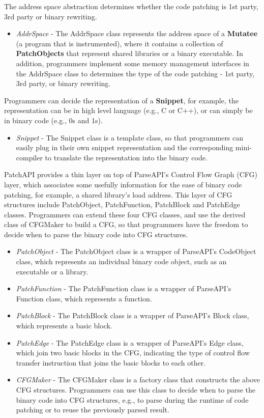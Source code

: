 The address space abstraction determines whether the code patching is 1st party,
3rd party or binary rewriting.
\begin{itemize}
\item \emph{AddrSpace} - The AddrSpace class represents the address space of a
  \textbf{Mutatee} (a program that is instrumented), where it contains a
  collection of \textbf{PatchObjects} that represent shared libraries or a
  binary executable. In addition, programmers implement some memory management
  interfaces in the AddrSpace class to determines the type of the code patching
  - 1st party, 3rd party, or binary rewriting.
\end{itemize}
Programmers can decide the representation of a \textbf{Snippet}, for example, the
representation can be in high level language (e.g., C or C++), or can simply be
in binary code (e.g., 0s and 1s).
\begin{itemize}
\item \emph{Snippet} - The Snippet class is a template class, so that programmers can
    easily plug in their own snippet representation and the corresponding
    mini-compiler to translate the representation into the binary code.
\end{itemize}
PatchAPI provides a thin layer on top of ParseAPI's Control Flow Graph (CFG)
layer, which associates some usefully information for the ease of binary code
patching, for example, a shared library's load address. This layer of CFG
structures include PatchObject, PatchFunction, PatchBlock and PatchEdge classes.
Programmers can extend these four CFG classes, and use the derived class of
CFGMaker to build a CFG, so that programmers have the freedom to decide when to
parse the binary code into CFG structures.
\begin{itemize}
\item \emph{PatchObject} - The PatchObject class is a wrapper of ParseAPI's CodeObject
    class, which represents an individual binary code object, such as an
    executable or a library.
\item \emph{PatchFunction} - The PatchFunction class is a wrapper of ParseAPI's
    Function class, which represents a function.
\item \emph{PatchBlock} - The PatchBlock class is a wrapper of ParseAPI's Block class,
    which represents a basic block.
\item \emph{PatchEdge} - The PatchEdge class is a wrapper of ParseAPI's Edge class,
    which join two basic blocks in the CFG, indicating the type of control flow
    transfer instruction that joins the basic blocks to each other.
\item \emph{CFGMaker} - The CFGMaker class is a factory class that constructs the above
    CFG structures. Programmers can use this class to decide when to parse the
    binary code into CFG structures, e.g., to parse during the runtime of code
    patching or to reuse the previously parsed result.
\end{itemize}
